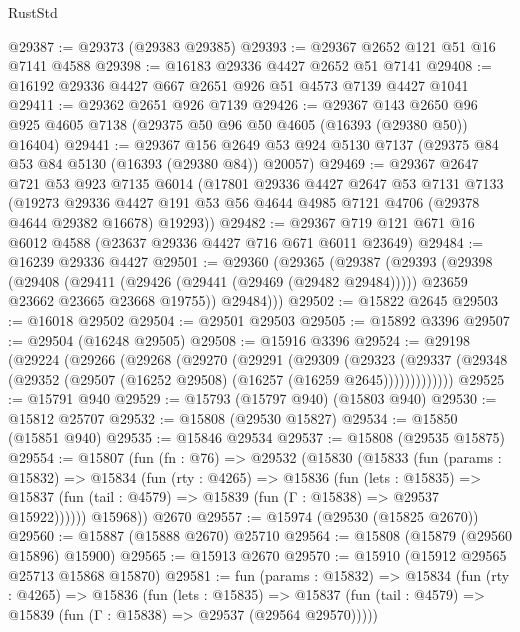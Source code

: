 \begin{lexlean}{RustStd}
\begin{coremodule}
@29387 := @29373 (@29383 @29385)
@29393 := @29367 @2652 @121 @51 @16 @7141 @4588
@29398 := @16183 @29336 @4427 @2652 @51 @7141
@29408 := @16192 @29336 @4427 @667 @2651 @926 @51 @4573 @7139 @4427 @1041
@29411 := @29362 @2651 @926 @7139
@29426 := @29367
    @143
    @2650
    @96
    @925
    @4605
    @7138
    (@29375 @50 @96 @50 @4605 (@16393 (@29380 @50)) @16404)
@29441 := @29367
    @156
    @2649
    @53
    @924
    @5130
    @7137
    (@29375 @84 @53 @84 @5130 (@16393 (@29380 @84)) @20057)
@29469 := @29367
    @2647
    @721
    @53
    @923
    @7135
    @6014
    (@17801
      @29336
      @4427
      @2647
      @53
      @7131
      @7133
      (@19273
        @29336
        @4427
        @191
        @53
        @56
        @4644
        @4985
        @7121
        @4706
        (@29378 @4644 @29382 @16678)
        @19293))
@29482 := @29367 @719 @121 @671 @16 @6012 @4588 (@23637 @29336 @4427 @716 @671 @6011 @23649)
@29484 := @16239 @29336 @4427
@29501 := @29360
    (@29365
      (@29387
        (@29393
          (@29398
            (@29408
              (@29411 (@29426 (@29441 (@29469 (@29482 @29484)))))
              @23659
              @23662
              @23665
              @23668
              @19755))
          @29484)))
@29502 := @15822 @2645
@29503 := @16018 @29502
@29504 := @29501 @29503
@29505 := @15892 @3396
@29507 := @29504 (@16248 @29505)
@29508 := @15916 @3396
@29524 := @29198
    (@29224
      (@29266
        (@29268
          (@29270
            (@29291
              (@29309
                (@29323
                  (@29337 (@29348 (@29352 (@29507 (@16252 @29508) (@16257 (@16259 @2645)))))))))))))
@29525 := @15791 @940
@29529 := @15793 (@15797 @940) (@15803 @940)
@29530 := @15812 @25707
@29532 := @15808 (@29530 @15827)
@29534 := @15850 (@15851 @940)
@29535 := @15846 @29534
@29537 := @15808 (@29535 @15875)
@29554 := @15807
    (fun (fn : @76) =>
    @29532
      (@15830
        (@15833
          (fun (params : @15832) =>
          @15834
            (fun (rty : @4265) =>
            @15836
              (fun (lets : @15835) =>
              @15837 (fun (tail : @4579) => @15839 (fun (Γ : @15838) => @29537 @15922))))))
        @15968))
    @2670
@29557 := @15974 (@29530 (@15825 @2670))
@29560 := @15887 (@15888 @2670) @25710
@29564 := @15808 (@15879 (@29560 @15896) @15900)
@29565 := @15913 @2670
@29570 := @15910 (@15912 @29565 @25713 @15868 @15870)
@29581 := fun (params : @15832) =>
  @15834
    (fun (rty : @4265) =>
    @15836
      (fun (lets : @15835) =>
      @15837 (fun (tail : @4579) => @15839 (fun (Γ : @15838) => @29537 (@29564 @29570)))))

\end{coremodule}
\end{lexlean}
